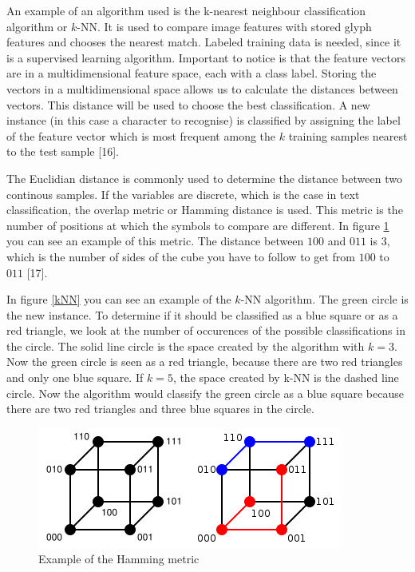 \documentclass[12pt]{article}
\begin{document}
An example of an algorithm used is the k-nearest neighbour classification algorithm or $k$-NN. It is used to compare image features with stored glyph features and chooses the nearest match. Labeled training data is needed, since it is a supervised learning algorithm. Important to notice is that the feature vectors are in a multidimensional feature space, each with a class label. Storing the vectors in a multidimensional space allows us to calculate the distances between vectors. This distance will be used to choose the best classification. A new instance (in this case a character to recognise) is classified by assigning the label of the feature vector which is most frequent among the $k$ training samples nearest to the test sample [16]. 
\newline

The Euclidian distance is commonly used to determine the distance between two continous samples. If the variables are discrete, which is the case in text classification, the overlap metric or Hamming distance is used. This metric is the number of positions at which the symbols to compare are different. In figure \ref{hamming} you can see an example of this metric. The distance between $100$ and $011$ is $3$, which is the number of sides of the cube you have to follow to get from $100$ to $011$ [17].
\newline

In figure \ref{kNN} you can see an example of the $k$-NN algorithm. The green circle is the new instance. To determine if it should be classified as a blue square or as a red triangle, we look at the number of occurences of the possible classifications in the circle. The solid line circle is the space created by the algorithm with $k = 3$. Now the green circle is seen as a red triangle, because there are two red triangles and only one blue square. If $k = 5$, the space created by k-NN is the dashed line circle. Now the algorithm would classify the green circle as a blue square because there are two red triangles and three blue squares in the circle. 

\begin{figure}[H]
\centering
\includegraphics[scale = 0.65]{img/hamming}
\caption{Example of the Hamming metric}
\label{hamming}
\end{figure} 
\end{document}
